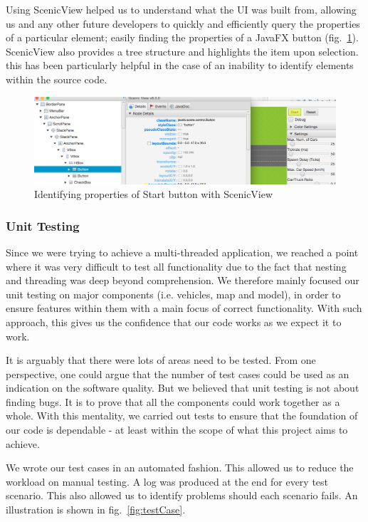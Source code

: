 Using ScenicView helped us to understand what the UI was built from, allowing us and any other future developers to quickly and efficiently query the properties of a particular element; easily finding the properties of a JavaFX button (fig.~\ref{fig:scenicview}). ScenicView also provides a tree structure and highlights the item upon selection. this has been particularly helpful in the case of an inability to identify elements within the source code.  
\begin{figure}[h]
	\begin{center}
		\includegraphics[width=\textwidth]{img/scenicView.png}
		\caption[Identifying properties of Start button with ScenicView]{Identifying properties of Start button with ScenicView}
	\label{fig:scenicview}
	\end{center}
\end{figure}

\subsubsection*{Unit Testing}
Since we were trying to achieve a multi-threaded application, we reached a point where it was very difficult to test all functionality due to the fact that nesting and threading was deep beyond comprehension. We therefore mainly focused our unit testing on major components (i.e. vehicles, map and model), in order to ensure features within them with a main focus of correct functionality. With such approach, this gives us the confidence that our code works as we expect it to work. 

It is arguably that there were lots of areas need to be tested. From one perspective, one could argue that the number of test cases could be used as an indication on the software quality. But we believed that unit testing is not about finding bugs. It is to prove that all the components could work together as a whole.  With this mentality, we carried out tests to ensure that the foundation of our code is dependable - at least within the scope of what this project aims to achieve.  

We wrote our test cases in an automated fashion. This allowed us to reduce the workload on manual testing.  A log was produced at the end for every test scenario. This also allowed us to identify problems should each scenario fails. An illustration is shown in fig.~\ref{fig:testCase}. 

